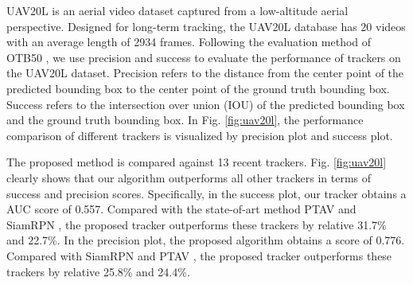UAV20L \cite{mueller2016benchmark} is an aerial video dataset captured from a low-altitude aerial perspective. Designed for long-term tracking, the UAV20L database has 20 videos with an average length of 2934 frames. 
Following the evaluation method of OTB50 \cite{wu2013online}, we use precision and success to evaluate the performance of  trackers on the UAV20L dataset. Precision refers to the distance from the center point of the predicted bounding box to the center point of the ground truth bounding box. Success refers to the intersection over union (IOU) of the predicted bounding box and the ground truth bounding box. In Fig. \ref{fig:uav20l}, the performance comparison of different trackers is visualized by precision plot and success plot.

The proposed method is compared against 13 recent trackers. Fig. \ref{fig:uav20l} clearly shows that our algorithm outperforms all other trackers in terms of success and precision scores. Specifically, in the success plot, our tracker obtains a AUC score of 0.557. Compared with the state-of-art method PTAV \cite{fan2018parallel} and SiamRPN \cite{li2018high}, the proposed tracker outperforms these trackers by relative 31.7\% and 22.7\%. In the precision plot, the proposed algorithm obtains a score of 0.776. Compared with SiamRPN \cite{li2018high} and PTAV \cite{fan2018parallel}, the proposed tracker outperforms these trackers by relative 25.8\% and 24.4\%. 

